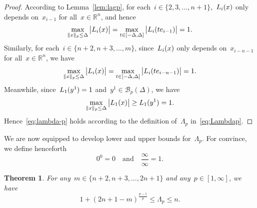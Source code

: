 \documentclass{article}
\numberwithin{equation}{section}
\theoremstyle{definition}
\theoremstyle{plain}
\newtheorem{theorem}{Theorem}[section]
\theoremstyle{remark}
\newcommand*{\abs}[2][]{#1\lvert#2#1\rvert}
\newcommand*{\lagp}[1][]{L\ifblank{#1}{}{_{#1}}}
\newcommand*{\norm}[2][]{#1\lVert#2#1\rVert}
\newcommand*{\R}{\mathbb{R}}
\newcommand*{\set}[2][]{#1\{#2#1\}}
\begin{document}
\begin{proof}
    According to Lemma~\ref{lem:lagp}, for each~$i \in \set{2, 3, \dots, n + 1}$,~$\lagp[i](x)$ only depends on~$x_{i - 1}$ for all~$x \in \R^n$, and hence
    \begin{equation*}
        \max_{\norm{x}_p \le \Delta} \abs[\big]{\lagp[i](x)} = \max_{t \in [-\Delta, \Delta]} \abs[\big]{\lagp[i](t e_{i - 1})} = 1.
    \end{equation*}
    Similarly, for each~$i \in \set{n + 2, n + 3, \dots, m}$, since~$\lagp[i](x)$ only depends on~$x_{i - n - 1}$ for all~$x \in \R^n$, we have
    \begin{equation*}
        \max_{\norm{x}_p \le \Delta} \abs[\big]{\lagp[i](x)} = \max_{t \in [-\Delta, \Delta]} \abs[\big]{\lagp[i](t e_{i - n - 1})} = 1.
    \end{equation*}
    Meanwhile, since~$\lagp[1](y^1) = 1$ and~$y^1 \in \mathcal{B}_p(\Delta)$, we have
    \begin{equation*}
        \max_{\norm{x}_p \le \Delta} \abs[\big]{\lagp[1](x)} \ge \lagp[1](y^1) = 1.
    \end{equation*}
    Hence~\eqref{eq:lambda-p} holds according to the definition of~$\Lambda_p$ in~\eqref{eq:Lambdap}.
\end{proof}

We are now equipped to develop lower and upper bounds for~$\Lambda_p$. For convince, we define
henceforth
\begin{equation*}
    0^0 = 0 \quad \text{and} \quad \frac{\infty}{\infty} = 1.
\end{equation*}


\begin{theorem}
    \label{thm:bounds}
    For any~$m \in \set{n + 2, n + 3, \dots, 2n + 1}$ and any~$p \in [1, \infty]$, we have
    \begin{equation}
    \label{eq:bounds}
        1 + (2n + 1 - m)^{\frac{p - 1}{p}} \le \Lambda_p \le n.
    \end{equation}
\end{theorem}
\end{document}
